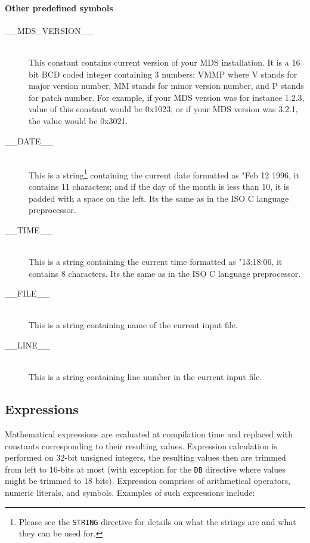             \paragraph{Other predefined symbols}
                \begin{description}
                    \item[\_\_MDS\_VERSION\_\_]~\\
                        This constant contains current version of your MDS installation. It is a 16 bit BCD coded integer containing 3 numbers: VMMP where V stands for major version number, MM stands for minor version number, and P stands for patch number. For example, if your MDS version was for instance 1.2.3, value of this constant would be 0x1023; or if your MDS version was 3.2.1, the value would be 0x3021.
                    \item[\_\_DATE\_\_]~\\
                        This is a string\footnote{Please see the \texttt{STRING} directive for details on what the strings are and what they can be used for.} containing the current date formatted as "Feb 12 1996, it contains 11 characters; and if the day of the month is less than 10, it is padded with a space on the left. Its the same as in the ISO C language preprocessor.
                    \item[\_\_TIME\_\_]~\\
                        This is a string containing the current time formatted as "13:18:06, it contains 8 characters. Its the same as in the ISO C language preprocessor.
                    \item[\_\_FILE\_\_]~\\
                        This is a string containing name of the current input file.
                    \item[\_\_LINE\_\_]~\\
                        This is a string containing line number in the current input file.
                \end{description}

    \subsection{Expressions}
        Mathematical expressions are evaluated at compilation time and replaced with constants corresponding to their resulting values. Expression calculation is performed on 32-bit unsigned integers, the resulting values then are trimmed from left to 16-bits at most (with exception for the \texttt{DB} directive where values might be trimmed to 18 bits). Expression comprises of arithmetical operators, numeric literals, and symbols. Examples of such expressions include:

